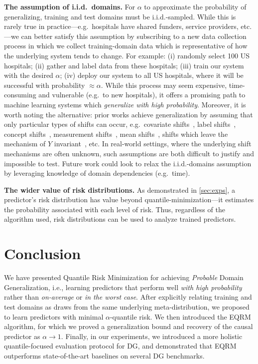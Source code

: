 \documentclass{article}
\begin{document}
\textbf{The assumption of i.i.d.\ domains.} For $\alpha$ to approximate the probability of generalizing, training and test domains must be i.i.d.-sampled. While this is rarely true in practice---e.g.\ hospitals have shared funders, service providers, etc.---we can better satisfy this assumption by subscribing to a new data collection process in which we collect training-domain data which is representative of how the underlying system tends to change. For example: (i) randomly select 100 US hospitals; (ii) gather and label data from these hospitals; (iii) train our system with the desired $\alpha$; (iv) deploy our system to all US hospitals, where it will be successful with probability $\approx \alpha$. While this process may seem expensive, time-consuming and vulnerable (e.g.\ to new hospitals), it offers a promising path to machine learning systems which \textit{generalize with high probability}. Moreover, it is worth noting the alternative: prior works achieve generalization by assuming that only particular types of shifts can occur, e.g.\ covariate shifts~\citep{quinonero2008dataset,Storkey09,robey2021modelbased}, label shifts~\citep{Storkey09, lipton2018detecting}, concept shifts~\citep{moreno2012unifying}, measurement shifts~\citep{eastwood2021source}, mean shifts~\citep{rothenhausler2021anchor}, shifts which leave the mechanism of $Y$ invariant~\cite{schoelkopf2012causal,peters2016causal,arjovsky2020invariant,krueger21rex}, etc. In real-world settings, where the underlying shift mechanisms are often unknown, such assumptions are both difficult to justify and impossible to test. Future work could look to relax the i.i.d.-domains assumption by leveraging knowledge of domain dependencies (e.g.\ time).

\textbf{The wider value of risk distributions.} As demonstrated in \cref{sec:exps}, a predictor's risk distribution has value beyond quantile-minimization---it estimates the probability associated with each level of risk. 
%
Thus, regardless of the algorithm used, risk distributions can be used to analyze trained predictors. 
%
%
%
%
%


%
%
%

%

%
%
%
%
%


%


\section{Conclusion}\vspace{-1mm}
%
We have presented Quantile Risk Minimization for achieving \textit{Probable} Domain Generalization, i.e., learning predictors that perform well \emph{with high probability} rather than \emph{on-average} or \emph{in the worst case}. After explicitly relating training and test domains as draws from the same underlying meta-distribution, we proposed to learn predictors with minimal $\alpha$-quantile risk. We then introduced the EQRM algorithm, for which we proved a generalization bound and recovery of the causal predictor
%
%
as $\alpha\! \to\! 1$.
 Finally, in our experiments, we introduced a more holistic quantile-focused evaluation protocol for DG, and demonstrated that EQRM outperforms state-of-the-art baselines on several DG benchmarks.
%
%
%
%
%
%
\end{document}
